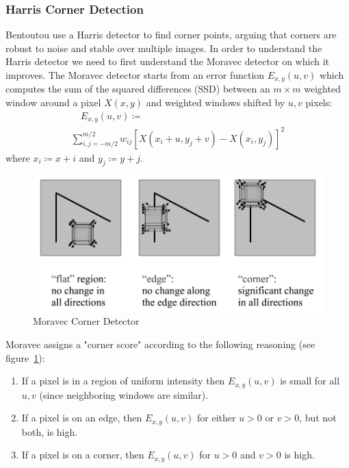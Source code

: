 \subsubsection{Harris Corner Detection}
Bentoutou \etal\cite{bentoutou2005automatic} use a Harris detector\cite{harris1988combined} to find corner points, arguing that corners are robust to noise and stable over multiple images.
%
In order to understand the Harris detector we need to first understand the Moravec\cite{moravec1980obstacle} detector on which it improves.
%
The Moravec detector starts from an error function \(E_{x,y}(u,v)\) which computes the sum of the squared differences (SSD) between an \(m \times m\) weighted window around a pixel \(X(x, y)\) and weighted windows shifted by \(u,v\) pixels:
\begin{multline}
	\quad E_{x,y}(u,v) \coloneqq \\ \sum_{i,j=-m/2}^{m/2} w_{ij}\left[ X(x_i+ u,y_j+v) - X(x_i, y_j)\right]^2
	\label{moravecerrorfunction}
\end{multline}
where \(x_i \coloneqq x + i\) and \(y_j \coloneqq y+j\).
\begin{figure}
	\centering
	\includegraphics[width=\linewidth,keepaspectratio]{figures/registration/corners.png}
	\caption{Moravec Corner Detector}
	\label{fig:corners}
\end{figure}
Moravec assigns a "corner score" according to the following reasoning (see figure~\ref{fig:corners}):
\begin{framed}
	\begin{enumerate}
		\item If a pixel is in a region of uniform intensity then \(E_{x,y}(u,v)\) is small for all \(u,v\) (since neighboring windows are similar).
		\item If a pixel is on an edge, then \(E_{x,y}(u,v)\) for either \(u > 0\) or \(v > 0\), but not both, is high.
		\item If a pixel is on a corner, then \(E_{x,y}(u,v)\) for \(u > 0\) and \(v > 0\) is high.
	\end{enumerate}
\end{framed}
